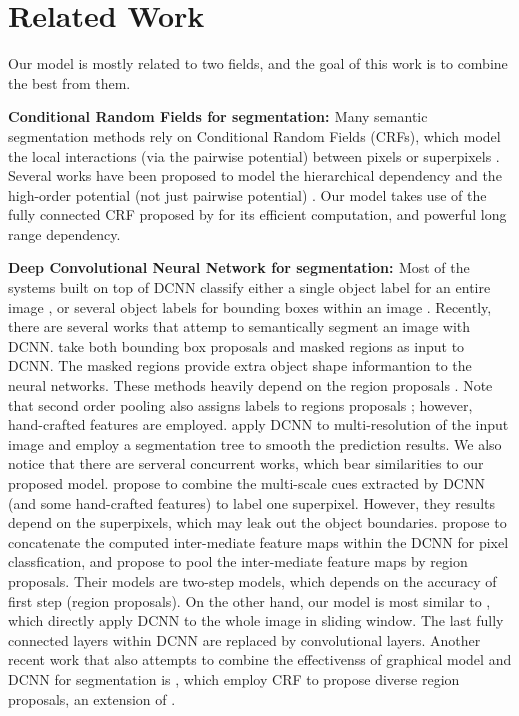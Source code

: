 \section{Related Work}
Our model is mostly related to two fields, and the goal of this work is to combine the best from them.

{\bf{Conditional Random Fields for segmentation: }} Many semantic segmentation methods rely on Conditional Random Fields (CRFs), which model the local interactions (via the pairwise potential) between pixels \citep{rother2004grabcut, shotton2009textonboost} or superpixels \citep{lucchi2011spatial}. Several works have been proposed to model the hierarchical dependency \citep{he2004multiscale, ladicky2009associative, lempitsky2011pylon} and the high-order potential (not just pairwise potential) \citep{delong2012fast, gonfaus2010harmony, kohli2009robust, krahenbuhl2011efficient}. Our model takes use of the fully connected CRF proposed by \citet{krahenbuhl2011efficient} for its efficient computation, and powerful long range dependency.

{\bf{Deep Convolutional Neural Network for segmentation: }} Most of the systems built on top of DCNN classify either a single object label for an entire image \citep{KrizhevskyNIPS2013, simonyan2014very, szegedy2014going}, or several object labels for bounding boxes within an image \citep{papandreou2014untangling, girshick2014rcnn}. Recently, there are several works that attemp to semantically segment an image with DCNN. \citet{girshick2014rcnn, hariharan2014simultaneous} take both bounding box proposals and masked regions as input to DCNN. The masked regions provide extra object shape informantion to the neural networks. These methods heavily depend on the region proposals \citep{arbelaez2014multiscale, Uijlings13}. Note that second order pooling \citep{carreira2012semantic} also assigns labels to regions proposals \citep{carreira2012cpmc}; however, hand-crafted features are employed. \citet{farabet2013learning} apply DCNN to multi-resolution of the input image and employ a segmentation tree to smooth the prediction results. We also notice that there are serveral concurrent works, which bear similarities to our proposed model. \citet{mostajabi2014feedforward} propose to combine the multi-scale cues extracted by DCNN (and some hand-crafted features) to label one superpixel. However, they results depend on the superpixels, which may leak out the object boundaries. \citet{hariharan2014hypercolumns} propose to concatenate the computed inter-mediate feature maps within the DCNN for pixel classfication, and \citet{dai2014convolutional} propose to pool the inter-mediate feature maps by region proposals. Their models are two-step models, which depends on the accuracy of first step (\ie region proposals). On the other hand, our model is most similar to \citet{long2014fully, eigen2014predicting}, which directly apply DCNN to the whole image in sliding window. The last fully connected layers within DCNN are replaced by convolutional layers. Another recent work that also attempts to combine the effectivenss of graphical model and DCNN for segmentation is \citet{cogswell2014combining}, which employ CRF to propose diverse region proposals, an extension of \citet{yadollahpour2013discriminative}.


